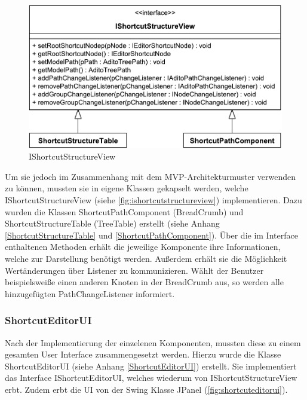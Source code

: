 \begin{figure}
	\vspace{-12px}
	\centering
	\includegraphics[width=1\linewidth]{../graphic/diagrams/CD_IShortcutStructureView/IShortcutStructureView}
	\caption{IShortcutStructureView}
	\label{fig:ishortcutstructureview}
\end{figure}

Um sie jedoch im Zusammenhang mit dem MVP-Architekturmuster verwenden zu können, mussten sie in eigene Klassen gekapselt werden, welche IShortcutStructureView (siehe \autoref{fig:ishortcutstructureview}) implementieren. Dazu wurden die Klassen ShortcutPathComponent (BreadCrumb) und ShortcutStructureTable (TreeTable) erstellt (siehe Anhang \ref{ShortcutStructureTable} und \ref{ShortcutPathComponent}). Über die im Interface enthaltenen Methoden erhält die jeweilige Komponente ihre Informationen, welche zur Darstellung benötigt werden. Außerdem erhält sie die Möglichkeit Wertänderungen über Listener zu kommunizieren. Wählt der Benutzer beispielsweiße einen anderen Knoten in der BreadCrumb aus, so werden alle hinzugefügten PathChangeListener informiert.

\subsubsection{ShortcutEditorUI}

Nach der Implementierung der einzelenen Komponenten, mussten diese zu einem gesamten User Interface zusammengesetzt werden. Hierzu wurde die Klasse ShortcutEditorUI (siehe Anhang \ref{ShortcutEditorUI}) erstellt. Sie implementiert das Interface IShortcutEditorUI, welches wiederum von IShortcutStructureView erbt. Zudem erbt die UI von der Swing Klasse JPanel (\autoref{fig:shortcuteditorui}).

